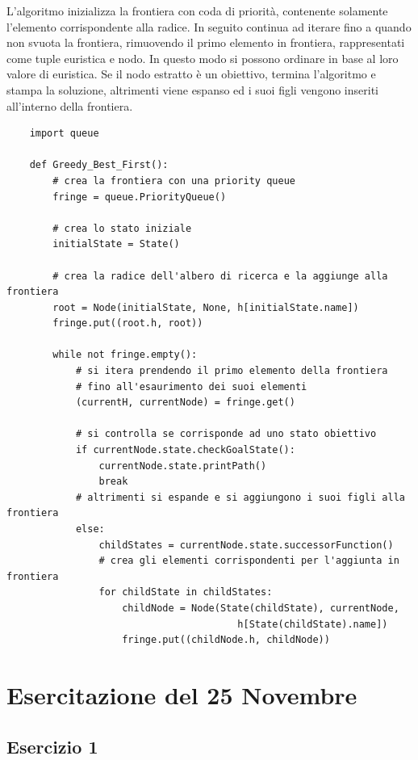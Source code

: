 \documentclass{article}
\numberwithin{equation}{section}
\begin{document}
L'algoritmo inizializza la frontiera con coda di priorità, contenente solamente l'elemento 
corrispondente alla radice. In seguito continua ad iterare fino a quando non svuota la 
frontiera, rimuovendo il primo elemento in frontiera, rappresentati come tuple euristica e 
nodo. In questo modo si possono ordinare in base al loro valore di euristica. Se il nodo 
estratto è un obiettivo, termina l'algoritmo e stampa la soluzione, altrimenti viene espanso ed i suoi 
figli vengono inseriti all'interno della frontiera. 
\begin{verbatim}
    import queue 

    def Greedy_Best_First():
        # crea la frontiera con una priority queue
        fringe = queue.PriorityQueue() 

        # crea lo stato iniziale
        initialState = State()

        # crea la radice dell'albero di ricerca e la aggiunge alla frontiera
        root = Node(initialState, None, h[initialState.name])
        fringe.put((root.h, root))

        while not fringe.empty():
            # si itera prendendo il primo elemento della frontiera
            # fino all'esaurimento dei suoi elementi
            (currentH, currentNode) = fringe.get()

            # si controlla se corrisponde ad uno stato obiettivo
            if currentNode.state.checkGoalState():
                currentNode.state.printPath()
                break
            # altrimenti si espande e si aggiungono i suoi figli alla frontiera
            else: 
                childStates = currentNode.state.successorFunction()
                # crea gli elementi corrispondenti per l'aggiunta in frontiera
                for childState in childStates:
                    childNode = Node(State(childState), currentNode, 
                                        h[State(childState).name])
                    fringe.put((childNode.h, childNode))
\end{verbatim}

\clearpage

\section{Esercitazione del 25 Novembre}

\subsection{Esercizio 1}
\end{document}
